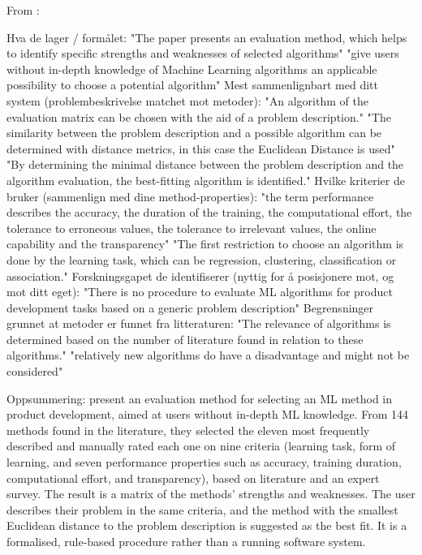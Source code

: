 From \parencite{riesener2020} :

Hva de lager / formålet:
"The paper presents an evaluation method, which helps to identify specific strengths and weaknesses of selected algorithms"
"give users without in-depth knowledge of Machine Learning algorithms an applicable possibility to choose a potential algorithm"
Mest sammenlignbart med ditt system (problembeskrivelse matchet mot metoder):
"An algorithm of the evaluation matrix can be chosen with the aid of a problem description."
"The similarity between the problem description and a possible algorithm can be determined with distance metrics, in this case the Euclidean Distance is used"
"By determining the minimal distance between the problem description and the algorithm evaluation, the best-fitting algorithm is identified."
Hvilke kriterier de bruker (sammenlign med dine method-properties):
"the term performance describes the accuracy, the duration of the training, the computational effort, the tolerance to erroneous values, the tolerance to irrelevant values, the online capability and the transparency"
"The first restriction to choose an algorithm is done by the learning task, which can be regression, clustering, classification or association."
Forskningsgapet de identifiserer (nyttig for å posisjonere mot, og mot ditt eget):
"There is no procedure to evaluate ML algorithms for product development tasks based on a generic problem description"
Begrensninger grunnet at metoder er funnet fra litteraturen:
"The relevance of algorithms is determined based on the number of literature found in relation to these algorithms."
"relatively new algorithms do have a disadvantage and might not be considered"

Oppsummering:
\textcite{riesener2020} present an evaluation method for 
selecting an ML method in product development, aimed at 
users without in-depth ML knowledge. From 144 methods 
found in the literature, they selected the eleven most 
frequently described and manually rated each one on nine 
criteria (learning task, form of learning, and seven 
performance properties such as accuracy, training duration, 
computational effort, and transparency), based on literature 
and an expert survey. The result is a matrix of the methods' 
strengths and weaknesses. The user describes their problem 
in the same criteria, and the method with the smallest 
Euclidean distance to the problem description is suggested 
as the best fit. It is a formalised, rule-based procedure 
rather than a running software system.

